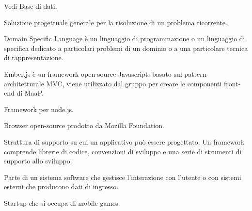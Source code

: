 
\begin{itemize}


Vedi Base di dati.





Soluzione progettuale generale per la risoluzione di un problema ricorrente.


Domain Specific Language è un linguaggio di programmazione o un linguaggio di specifica dedicato a particolari problemi di un dominio o a una particolare tecnica di rappresentazione.
\end{itemize}


\begin{itemize}


Ember.js è un framework open-source Javascript, basato sul pattern architetturale MVC, viene utilizzato dal gruppo per creare le componenti front-end di MaaP.


Framework per node.js.

\end{itemize}


\begin{itemize}


Browser open-source prodotto da Mozilla Foundation.


Struttura di supporto su cui un applicativo può essere progettato.
Un framework comprende librerie di codice, convenzioni di sviluppo e una serie di strumenti di supporto allo sviluppo.


Parte di un sistema software che gestisce l'interazione con l'utente o con sistemi esterni che producono dati di ingresso.


Startup che si occupa di mobile games.


\end{itemize}

